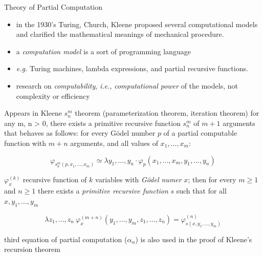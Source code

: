 \documentclass[aspectratio=169,dvipsnames]{beamer}
\begin{document}
\begin{frame}{Theory of Partial Computation}
    \begin{itemize}
        \item 
            in the 1930's Turing, Church, Kleene proposed several
            computational models and clarified the mathematical meanings of mechanical
            procedure.
        \item a \emph{computation model} is a sort of programming language
        \item \emph{e.g.} Turing machines, lambda expressions, and  partial recursive functions.
        \pause
        \item 
            research on \emph{computability}, \emph{i.e.,} \emph{computational power} 
            of the models, not complexity or efficiency
    \end{itemize}
\end{frame}

\begin{frame}
    Appears in Kleene $s^m_n$ theorem (parameterization theorem, iteration theorem)
    for any m, n > 0, there exists a primitive recursive function 
    $ s_{n}^{m}$ of $m + 1$ arguments that behaves as follows: 
    for every Gödel number $p$ of a partial computable function with $m + n$ 
    arguments, and all values of $x_1,\dots,x_m$: 
    
    \[
        \varphi_{s^m_n(p,x_1, \dots, x_m)} 
            \simeq         
                \lambda y_1, \dots, y_n \cdot \varphi_p (x_1, \dots, x_m, y_1, \dots, y_n) 
    \]


    $\varphi^{(k)}_x$ recursive function of $k$
 variables with \emph{G\"odel numer} $x$; 
 then for every $m\geq 1$ and $n\geq 1$ there exists
 a \emph{primitive recursive function} $s$ such that for all 
 $x, y_1, \dots, y_m$
 
 
    
 \[
    \lambda z_1, \dots, z_n \: \varphi_x^{(m+n)} (y_1, \dots, y_m, z_1, \dots, z_n) = \varphi^{(n)}_{s(x,y_1, \dots, y_m)}
\]


third equation of partial computation ($\alpha_\alpha$)
is also used in the proof of Kleene's recursion theorem



\end{frame}
\end{document}
